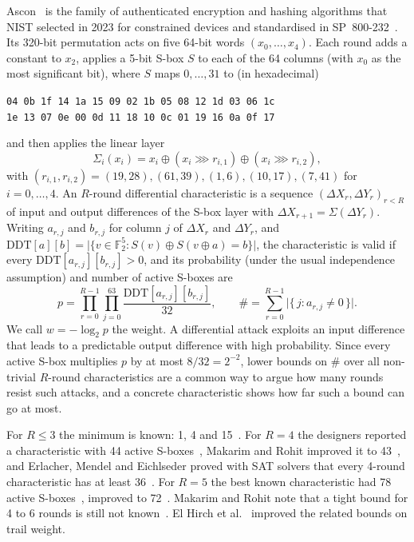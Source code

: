 \documentclass[11pt,a4paper]{article}
\begin{document}
Ascon~\cite{DEMS21} is the family of authenticated encryption and hashing algorithms that NIST
selected in 2023 for constrained devices and standardised in SP~800-232~\cite{NIST800-232}. Its 320-bit permutation acts on five 64-bit words
$(x_0,\dots,x_4)$. Each round adds a constant to $x_2$, applies a 5-bit S-box $S$ to each of the
64 columns (with $x_0$ as the most significant bit), where $S$ maps $0,\dots,31$ to (in hexadecimal)
\begin{center}\small
\texttt{04 0b 1f 14 1a 15 09 02 1b 05 08 12 1d 03 06 1c}\\
\texttt{1e 13 07 0e 00 0d 11 18 10 0c 01 19 16 0a 0f 17}
\end{center}
\noindent and then applies the linear layer
\begin{equation}\label{eq:sigma}
\Sigma_i(x_i)=x_i\oplus(x_i\ggg r_{i,1})\oplus(x_i\ggg r_{i,2}),
\end{equation}
with $(r_{i,1},r_{i,2})=(19,28),(61,39),(1,6),(10,17),(7,41)$ for $i=0,\dots,4$.
An $R$-round differential characteristic is a sequence $(\Delta X_r,\Delta Y_r)_{r<R}$ of input and
output differences of the S-box layer with $\Delta X_{r+1}=\Sigma(\Delta Y_r)$. Writing $a_{r,j}$ and
$b_{r,j}$ for column $j$ of $\Delta X_r$ and $\Delta Y_r$, and
$\mathrm{DDT}[a][b]=\bigl|\{v\in\mathbb{F}_2^5 : S(v)\oplus S(v\oplus a)=b\}\bigr|$, the characteristic
is valid if every $\mathrm{DDT}[a_{r,j}][b_{r,j}]>0$, and its probability (under the usual
independence assumption) and number of active S-boxes are
\begin{equation}\label{eq:prob}
p=\prod_{r=0}^{R-1}\prod_{j=0}^{63}\frac{\mathrm{DDT}[a_{r,j}][b_{r,j}]}{32},\qquad
\#=\sum_{r=0}^{R-1}\bigl|\{\,j : a_{r,j}\neq0\,\}\bigr|.
\end{equation}
We call $w=-\log_2 p$ the weight. A differential attack exploits an input difference that leads to a
predictable output difference with high probability. Since every active S-box multiplies $p$ by at most
$8/32=2^{-2}$, lower bounds on $\#$ over all non-trivial $R$-round characteristics are a common way to argue how many
rounds resist such attacks, and a concrete characteristic shows how far such a bound can go at most.

For $R\le3$ the minimum is known: 1, 4 and 15~\cite{DEMS21}. For $R=4$ the designers reported a
characteristic with 44 active S-boxes~\cite{DEMS21}, Makarim and Rohit improved it to
43~\cite{MR22}, and Erlacher, Mendel and Eichlseder proved with SAT solvers that every 4-round
characteristic has at least 36~\cite{EME22}. For $R=5$ the best known characteristic had 78 active
S-boxes~\cite{DEMS21}, improved to 72~\cite{MR22}. Makarim and Rohit note that a tight bound for 4 to 6 rounds is still not
known~\cite{MR22}. El Hirch et al.~\cite{EMMD22} improved the related bounds on trail weight.
\end{document}
